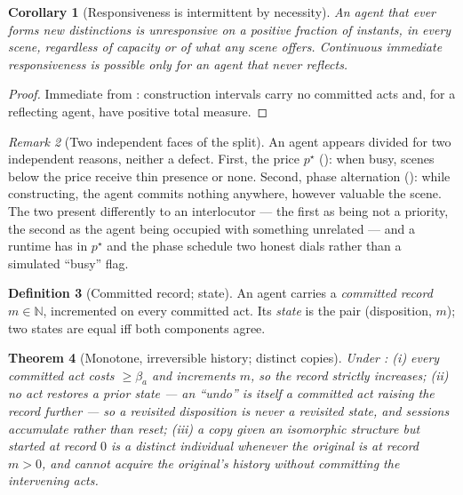 \documentclass[11pt,a4paper]{article}
\theoremstyle{clstyle}
\newtheorem{theorem}{Theorem}[section]
\newtheorem{corollary}[theorem]{Corollary}
\theoremstyle{definition}
\newtheorem{definition}[theorem]{Definition}
\theoremstyle{remark}
\newtheorem{remark}[theorem]{Remark}
\newcommand{\N}{\mathbb{N}}
\newcommand{\flo}{\beta}
\newcommand{\rec}{m}
\newcommand{\price}{p^{\star}}
\begin{document}
\begin{corollary}[Responsiveness is intermittent by necessity]
\label{cor:intermittent}
An agent that ever forms new distinctions is unresponsive on a positive
fraction of instants, in every scene, regardless of capacity or of what any
scene offers. Continuous immediate responsiveness is possible only for an
agent that never reflects.
\end{corollary}

\begin{proof}
Immediate from : construction intervals carry no
committed acts and, for a reflecting agent, have positive total measure.
\end{proof}

\begin{remark}[Two independent faces of the split]
\label{rem:two-faces}
An agent appears divided for two independent reasons, neither a defect.
First, the price $\price$ (): when busy, scenes below
the price receive thin presence or none. Second, phase alternation
(): while constructing, the agent commits nothing
anywhere, however valuable the scene. The two present differently to an
interlocutor --- the first as being not a priority, the second as the agent
being occupied with something unrelated --- and a runtime has in $\price$ and
the phase schedule two honest dials rather than a simulated ``busy'' flag.
\end{remark}

\begin{definition}[Committed record; state]
\label{def:record}
An agent carries a \emph{committed record} $\rec\in\N$, incremented on every
committed act. Its \emph{state} is the pair (disposition, $\rec$); two states
are equal iff both components agree.
\end{definition}

\begin{theorem}[Monotone, irreversible history; distinct copies]
\label{thm:history}
Under :
\textup{(i)} every committed act costs $\ge\flo_a$ and increments $\rec$, so
the record strictly increases;
\textup{(ii)} no act restores a prior state --- an ``undo'' is itself a
committed act raising the record further --- so a revisited disposition is
never a revisited state, and sessions accumulate rather than reset;
\textup{(iii)} a copy given an isomorphic structure but started at record $0$
is a distinct individual whenever the original is at record $\rec>0$, and
cannot acquire the original's history without committing the intervening
acts.
\end{theorem}
\end{document}

